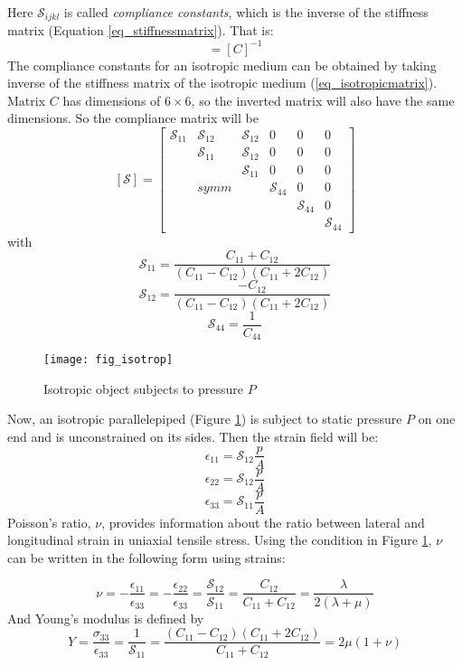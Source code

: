 \begin{doublespacing}
Here $\mathcal{S}_{ijkl}$ is called \textit{compliance constants}, which is the inverse of the stiffness matrix (Equation \ref{eq_stiffnessmatrix}). That is:
\begin{equation}
[\mathcal{S}]=[C]^{-1}
\end{equation}
The compliance constants for an isotropic medium can be obtained by taking inverse of the stiffness matrix of the isotropic medium (\ref{eq_isotropicmatrix}). Matrix $C$ has dimensions of $6\times6$, so the inverted matrix will also have the same dimensions. So the compliance matrix will be 
\begin{equation}
\label{eq_isotropicmatrix}
[\mathcal{S}] = \left[\begin{array}{cccccc}
 \mathcal{S}_{11} & \mathcal{S}_{12} &  \mathcal{S}_{12} & 0 & 0 & 0\\
          & \mathcal{S}_{11} & \mathcal{S}_{12} & 0 & 0 & 0 \\
          &          & \mathcal{S}_{11} & 0 & 0 & 0 \\
          & symm     &           & \mathcal{S}_{44} & 0 & 0 \\
          &          &            &         & \mathcal{S}_{44}  & 0 \\
          &          &           &          &           &\mathcal{S}_{44}
  
\end{array}  \right]
\end{equation}
with
$$
\mathcal{S}_{11}= \frac{C_{11}+C_{12}}{(C_{11}-C_{12})(C_{11}+2C_{12})}
$$
$$
\mathcal{S}_{12} = \frac{-C_{12}}{(C_{11}-C_{12})(C_{11}+2C_{12})} $$
$$
\mathcal{S}_{44} = \frac{1}{C_{44}}
$$
\begin{figure}[H]
\centering
\texttt{[image: fig\_isotrop]}
\caption{Isotropic object subjects to pressure $P$}
\label{fig_isotrop}
\end{figure}
Now, an isotropic parallelepiped (Figure \ref{fig_isotrop}) is subject to static pressure $P$ on one end and is unconstrained on its sides. Then the strain field will be: 
$$
\epsilon_{11}=\mathcal{S}_{12}\frac{p}{A}
$$
$$
\epsilon_{22}=\mathcal{S}_{12}\frac{p}{A}
$$
$$
\epsilon_{33}=\mathcal{S}_{11}\frac{p}{A}
$$
Poisson's ratio, $\nu$, provides information about the ratio between lateral and longitudinal strain in uniaxial tensile stress. Using the condition in Figure \ref{fig_isotrop}, $\nu$ can be written in the following  form using strains:

\begin{equation}
\label{eq_poisson}
\nu =-\frac{\epsilon_{11}}{\epsilon_{33}}=-\frac{\epsilon_{22}}{\epsilon_{33}}=\frac{\mathcal{S}_{12}}{\mathcal{S}_{11}}=\frac{C_{12}}{C_{11}+C_{12}}= \frac{\lambda}{2(\lambda+\mu)}
\end{equation}
And Young's modulus is defined by
\begin{equation}
\label{eq_youngmod}
Y=\frac{\sigma_{33}}{\epsilon_{33}}=\frac{1}{\mathcal{S}_{11}}=\frac{(C_{11}-C_{12})(C_{11}+2C_{12})}{C_{11}+C_{12}}=2\mu(1+\nu)
\end{equation}


\end{doublespacing}
